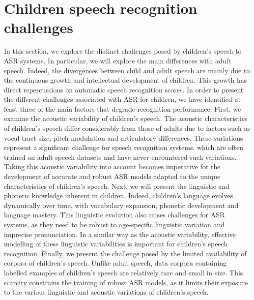 \section{Children speech  recognition challenges}%
\label{section:Children_seepch_challenges}
In this section, we explore the distinct challenges posed by children's speech to \ac{ASR} systems. In particular, we will explore the main differences with adult speech.  Indeed, the divergences between child and adult speech are mainly due to the continuous growth and intellectual development of children. This growth has direct repercussions on automatic speech recognition scores. In order to present the different challenges associated with \ac{ASR} for children, we have identified at least three of the main factors that degrade recognition performance.
First, we examine the acoustic variability of children's speech. The acoustic characteristics of children's speech differ considerably from those of adults due to factors such as vocal tract size, pitch modulation and articulatory differences. These variations represent a significant challenge for speech recognition systems, which are often trained on adult speech datasets and have never encountered such variations. Taking this acoustic variability into account becomes imperative for the development of accurate and robust \ac{ASR} models adapted to the unique characteristics of children's speech.
Next, we will present the linguistic and phonetic knowledge inherent in children. Indeed, children's language evolves dynamically over time, with vocabulary expansion, phonetic development and language mastery. This linguistic evolution also raises challenges for \ac{ASR} systems, as they need to be robust to age-specific linguistic variation and imprecise pronunciation. In a similar way as the acoustic variability, effective modelling of these linguistic variabilities is important for children's speech recognition.
Finally, we present the challenge posed by the limited availability of corpora of children's speech. Unlike adult speech, data corpora containing labelled examples of children's speech are relatively rare and small in size. This scarcity constrains the training of robust \ac{ASR} models, as it limits their exposure to the various linguistic and acoustic variations of children's speech.

